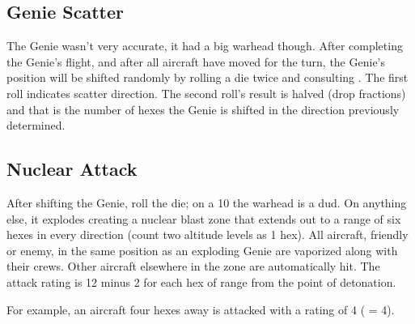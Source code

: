 \begin{advancedrules}
    \subsection{Genie Scatter} The Genie wasn't very accurate, it had a big warhead though. After completing the Genie's flight, and after all aircraft have moved for the turn, the Genie’s position will be shifted randomly by rolling a die twice and consulting . The first roll indicates scatter direction. The second roll's result is halved (drop fractions) and that is the number of hexes the Genie is shifted in the direction previously determined. 

    \subsection{Nuclear Attack} After shifting the Genie, roll the die; on a 10 the warhead is a dud. On anything else, it explodes creating a nuclear blast zone that extends out to a range of six hexes in every direction (count two altitude levels as 1 hex). All aircraft, friendly or enemy, in the same position as an exploding Genie are vaporized along with their crews. Other aircraft elsewhere in the zone are automatically hit. The attack rating is 12 minus 2 for each hex of range from the point of detonation.

    For example, an aircraft four hexes away is attacked with a rating of 4 ( = 4).

\end{advancedrules}
